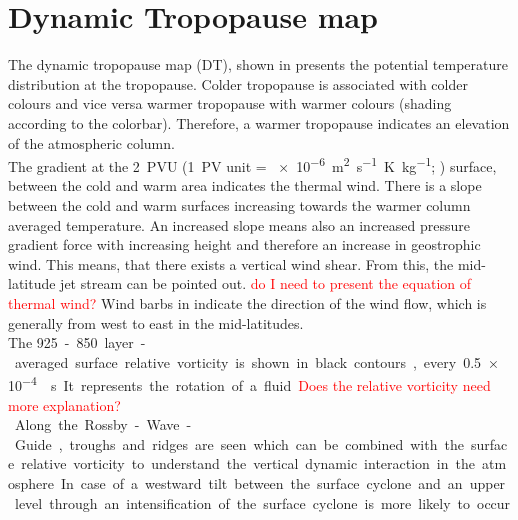 \section{Dynamic Tropopause map}
\label{sec:DT}
The dynamic tropopause map (DT), shown in  presents the potential temperature distribution at the tropopause. Colder tropopause is associated with colder colours and vice versa warmer tropopause with warmer colours (shading according to the colorbar). Therefore, a warmer tropopause indicates an elevation of the atmospheric column. 
\\
The gradient at the \SI{2}{PVU} (\SI{1}{PV} unit = \SI{e-6}{\metre\squared\per\s\kelvin\per\kg}; \cite{hoskins_use_1985}) surface, between the cold and warm area indicates the thermal wind. There is a slope between the cold and warm surfaces increasing towards the warmer column averaged temperature. An increased slope means also an increased pressure gradient force with increasing height and therefore an increase in geostrophic wind. This means, that there exists a vertical wind shear. From this, the mid-latitude jet stream can be pointed out.  \textcolor{red}{do I need to present the equation of thermal wind?} Wind barbs in \SI{}{\mPs} indicate the direction of the wind flow, which is generally from west to east in the mid-latitudes.  
\\
The  \SI{925}-\SI{850}{\hPa} layer-averaged surface relative vorticity is shown in black contours, every \SI{.5e-4}{\per\second}. It represents the rotation of a fluid. \textcolor{red}{Does the relative vorticity need more explanation? }
\\
Along the Rossby-Wave-Guide, troughs and ridges are seen which can be combined with the surface relative vorticity to understand the vertical dynamic interaction in the atmosphere. In case of a westward tilt between the surface cyclone and an upper level through an intensification of the surface cyclone is more likely to occur.


\newpage


